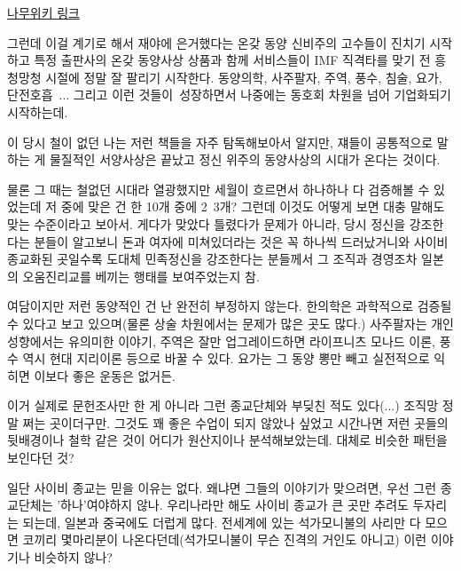 \begin{enumerate}
\href{https://namu.wiki/w/%EA%B5%AD%ED%92%8D81}{나무위키 링크}

\vspace{5mm}

그런데 이걸 계기로 해서 재야에 은거했다는 온갖 동양 신비주의 고수들이 진치기 시작하고
특정 출판사의 온갖 동양사상 상품과 함께 서비스들이 IMF 직격타를 맞기 전 흥청망청 시절에 정말 잘 팔리기 시작한다.
동양의학, 사주팔자, 주역, 풍수, 침술, 요가, 단전호흡 ... 그리고 이런 것들이 성장하면서 나중에는 동호회 차원을 넘어 기업화되기 시작하는데.
\vspace{5mm}

이 당시 철이 없던 나는 저런 책들을 자주 탐독해보아서 알지만,
쟤들이 공통적으로 말하는 게 물질적인 서양사상은 끝났고 정신 위주의 동양사상의 시대가 온다는 것이다.
\vspace{5mm}

물론 그 때는 철없던 시대라 열광했지만 세월이 흐르면서 하나하나 다 검증해볼 수 있었는데
저 중에 맞은 건 한 10개 중에 2~3개? 그런데 이것도 어떻게 보면 대충 말해도 맞는 수준이라고 보아서.
게다가 맞았다 틀렸다가 문제가 아니라, 당시 정신을 강조한다는 분들이 알고보니 돈과 여자에 미쳐있더라는 것은 꼭 하나씩 드러났거니와
사이비 종교화된 곳일수록 도대체 민족정신을 강조한다는 분들께서 그 조직과 경영조차 일본의 오움진리교를 베끼는 행태를 보여주었는지 참.
\vspace{5mm}

여담이지만 저런 동양적인 건 난 완전히 부정하지 않는다.
한의학은 과학적으로 검증될 수 있다고 보고 있으며(물론 상술 차원에서는 문제가 많은 곳도 많다.)
사주팔자는 개인 성향에서는 유의미한 이야기, 주역은 잘만 업그레이드하면 라이프니츠 모나드 이론,
풍수 역시 현대 지리이론 등으로 바꿀 수 있다. 요가는 그 동양 뽕만 빼고 실전적으로 익히면 이보다 좋은 운동은 없거든.
\vspace{5mm}

이거 실제로 문헌조사만 한 게 아니라 그런 종교단체와 부딪친 적도 있다(...) 조직망 정말 쩌는 곳이더구만.
그것도 꽤 좋은 수업이 되지 않았나 싶었고 시간나면 저런 곳들의 뒷배경이나 철학 같은 것이 어디가 원산지이나 분석해보았는데.
대체로 비슷한 패턴을 보인다던 것?
\vspace{5mm}

일단 사이비 종교는 믿을 이유는 없다. 왜냐면 그들의 이야기가 맞으려면, 우선 그런 종교단체는 '하나'여야하지 않나.
우리나라만 해도 사이비 종교가 큰 곳만 추려도 두자리는 되는데, 일본과 중국에도 더럽게 많다.
전세계에 있는 석가모니불의 사리만 다 모으면 코끼리 몇마리분이 나온다던데(석가모니불이 무슨 진격의 거인도 아니고)
이런 이야기나 비슷하지 않나?
\vspace{5mm}


\end{enumerate}
